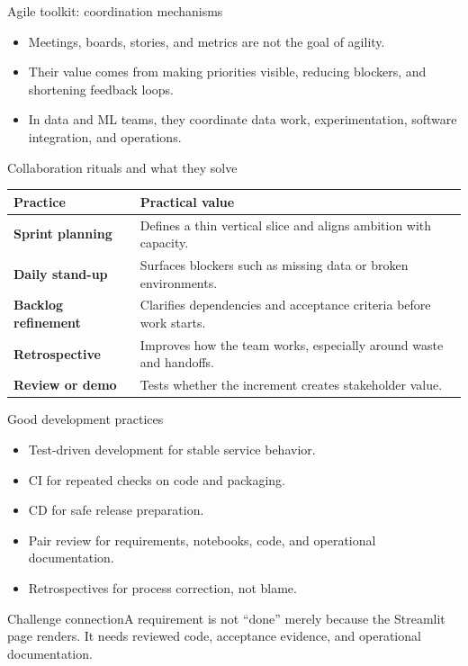 \begin{frame}{Agile toolkit: coordination mechanisms}
\begin{itemize}
\item Meetings, boards, stories, and metrics are not the goal of agility.
\item Their value comes from making priorities visible, reducing blockers, and shortening feedback loops.
\item In data and ML teams, they coordinate data work, experimentation, software integration, and operations.
\end{itemize}
\coursefooter
\end{frame}

\begin{frame}{Collaboration rituals and what they solve}
\begin{tabularx}{\textwidth}{>{\bfseries}l X}
Practice & Practical value \\
\toprule
Sprint planning & Defines a thin vertical slice and aligns ambition with capacity. \\
Daily stand-up & Surfaces blockers such as missing data or broken environments. \\
Backlog refinement & Clarifies dependencies and acceptance criteria before work starts. \\
Retrospective & Improves how the team works, especially around waste and handoffs. \\
Review or demo & Tests whether the increment creates stakeholder value. \\
\bottomrule
\end{tabularx}
\coursefooter
\end{frame}

\begin{frame}{Good development practices}
\begin{itemize}
\item Test-driven development for stable service behavior.
\item CI for repeated checks on code and packaging.
\item CD for safe release preparation.
\item Pair review for requirements, notebooks, code, and operational documentation.
\item Retrospectives for process correction, not blame.
\end{itemize}
\begin{block}{Challenge connection}A requirement is not ``done'' merely because the Streamlit page renders. It needs reviewed code, acceptance evidence, and operational documentation.\end{block}
\coursefooter
\end{frame}

